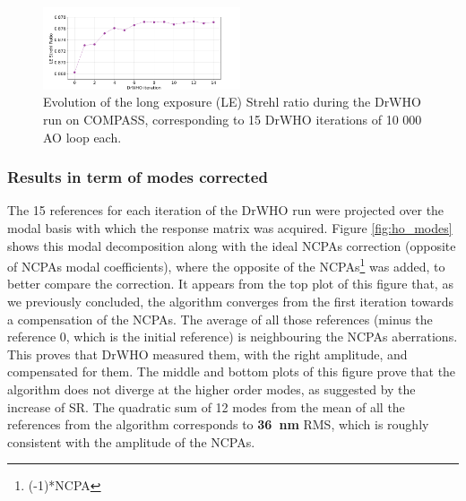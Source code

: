 \documentclass[twocolumn]{aa}
\begin{document}
\begin{figure}[t]
\begin{center}
\includegraphics[width=0.52\textwidth]{fig/LE_SR.png}
\caption{Evolution of the long exposure (LE) Strehl ratio during the DrWHO run on COMPASS, corresponding to 15 DrWHO iterations of 10 000 AO loop each.}
\label{fig:compass_LE_SR}
\end{center}
\end{figure}





\subsubsection{Results in term of modes corrected}

The 15 references for each iteration of the DrWHO run were projected over the modal basis with which the response matrix was acquired. Figure \ref{fig:ho_modes} shows this modal decomposition along with the ideal NCPAs correction (opposite of NCPAs modal coefficients), where the opposite of the NCPAs\footnote{(-1)*NCPA} was added, to better compare the correction. It appears from the top plot of this figure that, as we previously concluded, the algorithm converges from the first iteration towards a compensation of the NCPAs. The average of all those references (minus the reference 0, which is the initial reference) is neighbouring the NCPAs aberrations. This proves that DrWHO measured them, with the right amplitude, and compensated for them. 
The middle and bottom plots of this figure prove that the algorithm does not diverge at the higher order modes, as suggested by the increase of SR. 
The quadratic sum of 12 modes from the mean of all the references from the algorithm corresponds to \textbf{36~nm} RMS, which is roughly consistent with the amplitude of the NCPAs.
\end{document}
